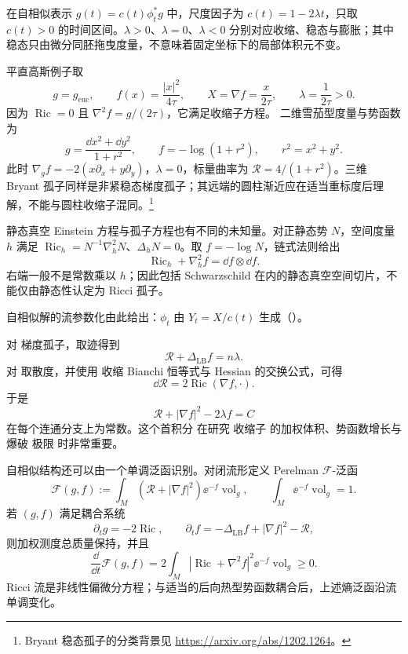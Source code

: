在自相似表示 $g(t)=c(t)\phi_t^*g$ 中，尺度因子为 $c(t)=1-2\lambda t$，只取 $c(t)>0$ 的时间区间。$\lambda>0$、$\lambda=0$、$\lambda<0$ 分别对应收缩、稳态与膨胀；其中稳态只由微分同胚拖曳度量，不意味着固定坐标下的局部体积元不变。

平直高斯例子取
\[
 g=g_{\mathrm{euc}},\qquad
 f(x)=\frac{|x|^2}{4\tau},\qquad
 X=\nabla f=\frac{x}{2\tau},\qquad
 \lambda=\frac1{2\tau}>0.
\]
因为 $\operatorname{Ric}=0$ 且 $\nabla^2f=g/(2\tau)$，它满足收缩子方程。
二维雪茄型度量与势函数为
\[
 g=\frac{\dd x^2+\dd y^2}{1+r^2},\qquad
 f=-\log(1+r^2),\qquad r^2=x^2+y^2.
\]
此时 $\nabla_gf=-2(x\partial_x+y\partial_y)$，$\lambda=0$，标量曲率为 $\mathcal R=4/(1+r^2)$。三维 Bryant 孤子同样是非紧稳态梯度孤子；其远端的圆柱渐近应在适当重标度后理解，不能与圆柱收缩子混同。\footnote{Bryant 稳态孤子的分类背景见 \url{https://arxiv.org/abs/1202.1264}。}

静态真空 Einstein 方程与孤子方程也有不同的未知量。对正静态势 $N$，空间度量 $h$ 满足 $\operatorname{Ric}_h=N^{-1}\nabla_h^2N$、$\Delta_hN=0$。取 $f=-\log N$，链式法则给出
\[
 \operatorname{Ric}_h+\nabla_h^2f=\dd f\otimes\dd f.
\]
右端一般不是常数乘以 $h$；因此包括 Schwarzschild 在内的静态真空空间切片，不能仅由静态性认定为 Ricci 孤子。

自相似解的流参数化由此给出：$\phi_t$ 由 $Y_t=X/c(t)$ 生成（）。

对 梯度孤子，取迹得到
\begin{equation*}\mathcal R+\Delta_{\mathrm{LB}}f=n\lambda.\end{equation*}
对 取散度，并使用 收缩 Bianchi 恒等式与 Hessian 的交换公式，可得
\[
\dd\mathcal R=2\operatorname{Ric}(\nabla f,\cdot).
\]
于是
\begin{equation*}{
\mathcal R+|\nabla f|^2-2\lambda f=C
}\end{equation*}
在每个连通分支上为常数。这个首积分 在研究 收缩子 的加权体积、势函数增长与 爆破 极限 时非常重要。

自相似结构还可以由一个单调泛函识别。对闭流形定义 Perelman $\mathcal F$-泛函
\begin{equation*}\mathcal F(g,f)
:=\int_M
\left(\mathcal R+|\nabla f|^2\right)
\ee^{-f}\operatorname{vol}_g,
\qquad
\int_M\ee^{-f}\operatorname{vol}_g=1.\end{equation*}
若 $(g,f)$ 满足耦合系统
\begin{equation}
\partial_tg=-2\operatorname{Ric},
\qquad
\partial_tf
=-\Delta_{\mathrm{LB}}f+|\nabla f|^2-\mathcal R,
\label{eq:math-dg-perelman-coupled-flow}
\end{equation}
则加权测度总质量保持，并且
\begin{equation}
{
\frac{\dd}{\dd t}\mathcal F(g,f)
=2\int_M
|\operatorname{Ric}+\nabla^2f|^2
\ee^{-f}\operatorname{vol}_g
\ge0.
}
\label{eq:math-dg-perelman-f-monotonicity}
\end{equation}
Ricci 流是非线性偏微分方程；与适当的后向热型势函数耦合后，上述熵泛函沿流单调变化。

